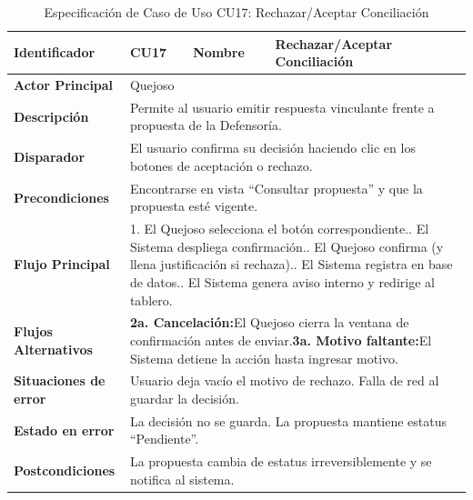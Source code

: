 \begingroup
\setlength{\parskip}{0pt}
\begin{longtable}{|p{3.5cm}|p{2cm}|p{2.5cm}|p{7cm}|}
\caption{Especificación de Caso de Uso CU17: Rechazar/Aceptar Conciliación}
\label{tab:cu17_conciliacion} \\
\hline
\textbf{Identificador} & CU17 & \textbf{Nombre} & Rechazar/Aceptar Conciliación \\ \hline
\textbf{Actor Principal} & \multicolumn{3}{p{11.5cm}|}{Quejoso} \\ \hline
\textbf{Descripción} & \multicolumn{3}{p{11.5cm}|}{Permite al usuario emitir respuesta vinculante frente a propuesta de la Defensoría.} \\ \hline
\textbf{Disparador} & \multicolumn{3}{p{11.5cm}|}{El usuario confirma su decisión haciendo clic en los botones de aceptación o rechazo.} \\ \hline
\textbf{Precondiciones} & \multicolumn{3}{p{11.5cm}|}{Encontrarse en vista ``Consultar propuesta'' y que la propuesta esté vigente.} \\ \hline
\textbf{Flujo Principal} & \multicolumn{3}{p{11.5cm}|}{1. El Quejoso selecciona el botón correspondiente.\newline 2. El Sistema despliega confirmación.\newline 3. El Quejoso confirma (y llena justificación si rechaza).\newline 4. El Sistema registra en base de datos.\newline 5. El Sistema genera aviso interno y redirige al tablero.} \\ \hline
\textbf{Flujos Alternativos} & \multicolumn{3}{p{11.5cm}|}{\textbf{2a. Cancelación:}\newline El Quejoso cierra la ventana de confirmación antes de enviar.\newline\newline \textbf{3a. Motivo faltante:}\newline El Sistema detiene la acción hasta ingresar motivo.} \\ \hline
\textbf{Situaciones de error} & \multicolumn{3}{p{11.5cm}|}{Usuario deja vacío el motivo de rechazo. Falla de red al guardar la decisión.} \\ \hline
\textbf{Estado en error} & \multicolumn{3}{p{11.5cm}|}{La decisión no se guarda. La propuesta mantiene estatus ``Pendiente''.} \\ \hline
\textbf{Postcondiciones} & \multicolumn{3}{p{11.5cm}|}{La propuesta cambia de estatus irreversiblemente y se notifica al sistema.} \\ \hline
\end{longtable}
\endgroup

